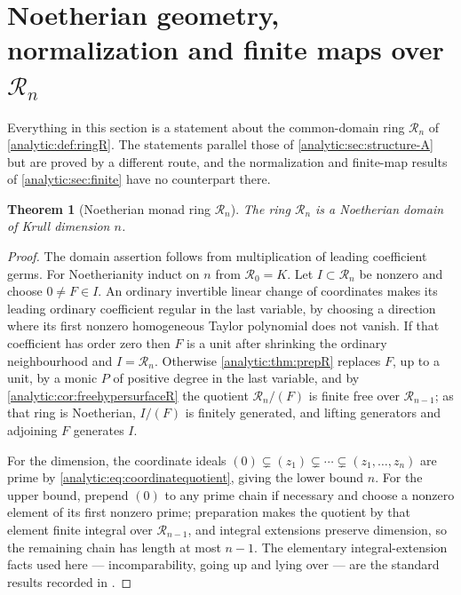 \documentclass[11pt,letterpaper]{article}
\newtheorem{theorem}{Theorem}[section]
\theoremstyle{definition}
\theoremstyle{remark}
\newcommand{\RR}{\mathscr R}
\numberwithin{equation}{section}
\begin{document}
\section{Noetherian geometry, normalization and finite maps over $\RR_n$}
\label{analytic:sec:structure-R}

Everything in this section is a statement about the common-domain ring
$\RR_n$ of \cref{analytic:def:ringR}. The statements parallel those of
\cref{analytic:sec:structure-A} but are proved by a different route, and
the normalization and finite-map results of
\cref{analytic:sec:finite} have no counterpart there.

\begin{theorem}[Noetherian monad ring $\RR_n$]
\label{analytic:thm:noetherianR}
The ring $\RR_n$ is a Noetherian domain of Krull dimension $n$.
\end{theorem}
\begin{proof}
The domain assertion follows from multiplication of leading coefficient
germs. For Noetherianity induct on $n$ from $\RR_0=K$. Let $I\subset\RR_n$
be nonzero and choose $0\ne F\in I$. An ordinary invertible linear change of
coordinates makes its leading ordinary coefficient regular in the last
variable, by choosing a direction where its first nonzero homogeneous
Taylor polynomial does not vanish. If that coefficient has order zero then
$F$ is a unit after shrinking the ordinary neighbourhood and $I=\RR_n$.
Otherwise \cref{analytic:thm:prepR} replaces $F$, up to a unit, by a monic
$P$ of positive degree in the last variable, and by
\cref{analytic:cor:freehypersurfaceR} the quotient $\RR_n/(F)$ is finite
free over $\RR_{n-1}$; as that ring is Noetherian, $I/(F)$ is finitely
generated, and lifting generators and adjoining $F$ generates $I$.

For the dimension, the coordinate ideals
$(0)\subsetneq(z_1)\subsetneq\cdots\subsetneq(z_1,\ldots,z_n)$ are prime by
\eqref{analytic:eq:coordinatequotient}, giving the lower bound $n$. For the
upper bound, prepend $(0)$ to any prime chain if necessary and choose a
nonzero element of its first nonzero prime; preparation makes the quotient
by that element finite integral over $\RR_{n-1}$, and integral extensions
preserve dimension, so the remaining chain has length at most $n-1$. The
elementary integral-extension facts used here --- incomparability, going up
and lying over --- are the standard results recorded in \cite{Stacks}.
\end{proof}
\end{document}
